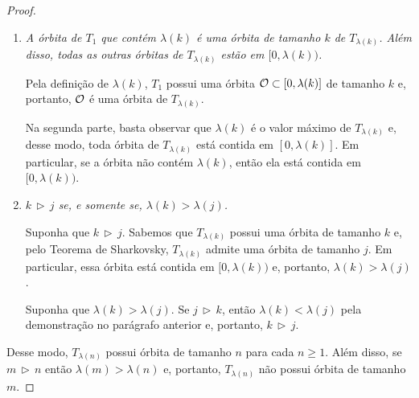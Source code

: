 \begin{proof}
\begin{enumerate}[label=\alph*)]
\item \textit{A órbita de $T_1$ que contém $\lambda(k)$ é uma órbita de tamanho $k$ de $T_{\lambda(k)}$.
Além disso, todas as outras órbitas de $T_{\lambda(k)}$ estão em $[0, \lambda(k))$.} 

Pela definição de $\lambda(k)$, $T_1$ possui uma órbita $\mathcal{O} \subset [0, \lambda(k)]$ de tamanho $k$ e, portanto, $\mathcal{O}$ é uma órbita de $T_{\lambda(k)}$.

Na segunda parte, basta observar que $\lambda(k)$ é o valor máximo de $T_{\lambda(k)}$ e, desse modo, toda órbita de $T_{\lambda(k)}$ está contida em $[0, \lambda(k)]$.
Em particular, se a órbita não contém $\lambda(k)$, então ela está contida em $[0, \lambda(k))$.

\item \textit{$k \, \triangleright \, j$ se, e somente se, $\lambda(k) > \lambda(j)$.}

Suponha que $k \, \triangleright \, j$. Sabemos que $T_{\lambda(k)}$ possui uma órbita de tamanho $k$ e, pelo Teorema de Sharkovsky, $T_{\lambda(k)}$ admite uma órbita de tamanho $j$. Em particular, essa órbita está contida em $[0, \lambda(k))$ e, portanto, $\lambda(k) > \lambda(j)$.

Suponha que $\lambda(k) > \lambda(j)$. Se $j \, \triangleright \, k$, então $\lambda(k) < \lambda(j)$ pela demonstração no parágrafo anterior e, portanto, $k \, \triangleright \, j$.
\end{enumerate}

Desse modo, $T_{\lambda(n)}$ possui órbita de tamanho $n$ para cada $n \geq 1$. Além disso, se $m \, \triangleright \, n$ então $\lambda(m) > \lambda(n)$ e, portanto, $T_{\lambda(n)}$ não possui órbita de tamanho $m$.
\end{proof}
